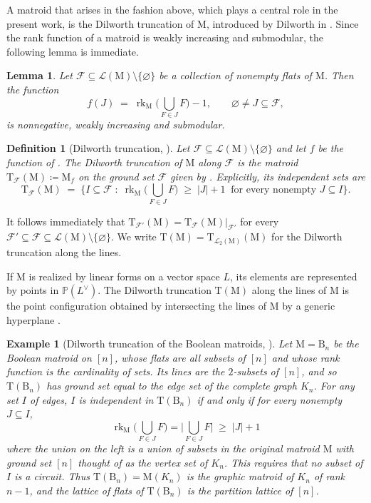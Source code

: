 \documentclass[11pt,a4paper,reqno]{amsart}
\theoremstyle{results}
\newtheorem{lemma}[thm]{Lemma}
\theoremstyle{definitions}
\newtheorem{definition}[thm]{Definition}
\newtheorem{example}[thm]{Example}
\def\P{\mathbb{P}}
\def\calF{\mathcal{F}}
\def\calL{\mathcal{L}}
\newcommand{\B}{\textrm{B}}
\newcommand{\rk}{\operatorname{rk}}
\newcommand{\M}{\mathrm{M}}
\renewcommand{\emptyset}{\varnothing}
\newcommand{\Lines}{\mathcal{L}_2}
\newcommand{\DT}{\mathrm{T}}      %
\begin{document}
A matroid that arises in the fashion above, which plays a central role in the present work, is the Dilworth truncation of $\M$, introduced by Dilworth in \cite{dilworth1944dependence}.
Since the rank function of a matroid is weakly increasing and submodular, the following lemma is immediate.
\begin{lemma}\label{lem:dilworth-matroid}
  Let $\calF \subseteq \calL(\M) \setminus \{\varnothing\}$ be a collection of
  nonempty flats of $\M$.  Then the function
  \[
    f(J) \;=\; \rk_{\M}\Big(\bigcup_{F \in J} F\Big) - 1,
    \qquad \emptyset \neq J \subseteq \calF,
  \]
  is nonnegative, weakly increasing and submodular.
\end{lemma}

\begin{definition}[Dilworth truncation, {\cite{dilworth1944dependence}}]
  \label{def:dilworth}
  Let $\calF \subseteq \calL(\M) \setminus \{\varnothing\}$ and let $f$ be the
  function of .  The \emph{Dilworth truncation} of
  $\M$ along $\calF$ is the matroid $\DT_{\calF}(\M) \coloneqq \M_f$ on the
  ground set $\calF$ given by . Explicitly, its independent
  sets are
  \begin{equation}\label{eq:dilworth}
    \DT_{\calF}(\M) \;=\; \Big\{ I \subseteq \calF \;:\;
      \rk_{\M}\Big(\bigcup_{F \in J} F\Big) \;\geqslant\; |J| + 1
      \ \text{ for every nonempty } J \subseteq I \Big\}.
  \end{equation}
\end{definition}
It follows immediately that $\DT_{\calF'}(\M) = \DT_{\calF}(\M)|_{\calF'}$ for every
  $\calF' \subseteq \calF \subseteq \calL(\M) \setminus \{\varnothing\}$.  We write $\DT(\M) = \DT_{\Lines(\M)}(\M)$ for the Dilworth truncation along the lines. 

If $\M$ is realized by linear forms on a vector space $L$, its elements
are represented by points in $\P(L^{\vee})$. The Dilworth truncation $\DT(\M)$ along the lines of $\M$ is the point configuration obtained by intersecting the lines of $\M$ by a generic hyperplane \cite{crapo1970foundations,mason1977matroids,kung1990dilworth}.


\begin{example}[Dilworth truncation of the Boolean matroids, {\cite[Theorem 3.2]{dilworth1944dependence}}]
  \label{ex:dilworth-boolean}
  Let $\M = \B_n$ be the Boolean matroid on $[n]$, whose flats are all
  subsets of $[n]$ and whose rank function is the cardinality of sets.  Its lines are the
  $2$-subsets of $[n]$, and so $\DT(\B_n)$ has ground set equal to the edge set of the
  complete graph $K_n$. For any set $I$ of edges, $I$ is independent in $\DT(\B_n)$ if and only if for every nonempty $J \subseteq I$,
  \[
  \rk_{\M}\Big(\bigcup_{F \in J} F \Big) = \Big| \bigcup_{F \in J } F \Big| \;\geqslant\; |J| + 1
  \]
  where the union on the left is a union of subsets in the original matroid $\M$ with ground set $[n]$ thought of as the vertex set of $K_n$.
  This requires that no subset of $I$ is a circuit. Thus $\DT(\B_n) = \M(K_n)$
  is the graphic matroid of $K_n$ of rank $n-1$, and the lattice of
  flats of $\DT(\B_n)$ is the partition lattice of $[n]$.
\end{example}
\end{document}
